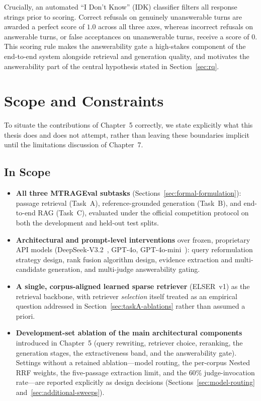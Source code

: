 Crucially, an automated ``I Don't Know'' (IDK) classifier filters all response strings prior to scoring. Correct refusals on genuinely unanswerable turns are awarded a perfect score of $1.0$ across all three axes, whereas incorrect refusals on answerable turns, or false acceptances on unanswerable turns, receive a score of $0$. This scoring rule makes the answerability gate a high-stakes component of the end-to-end system alongside retrieval and generation quality, and motivates the answerability part of the central hypothesis stated in Section~\ref{sec:rq}.

\section{Scope and Constraints}
\label{sec:scope}

To situate the contributions of Chapter~5 correctly, we state explicitly what this thesis does and does not attempt, rather than leaving these boundaries implicit until the limitations discussion of Chapter~7.

\subsection{In Scope}

\begin{itemize}
    \item \textbf{All three MTRAGEval subtasks} (Sections~\ref{sec:formal-formulation}): passage retrieval (Task~A), reference-grounded generation (Task~B), and end-to-end RAG (Task~C), evaluated under the official competition protocol on both the development and held-out test splits.
    \item \textbf{Architectural and prompt-level interventions} over frozen, proprietary API models (DeepSeek-V3.2~\citep{deepseekai2024deepseekv3}, GPT-4o, GPT-4o-mini~\citep{openai2024gpt4o}): query reformulation strategy design, rank fusion algorithm design, evidence extraction and multi-candidate generation, and multi-judge answerability gating.
    \item \textbf{A single, corpus-aligned learned sparse retriever} (ELSER~v1) as the retrieval backbone, with retriever \emph{selection} itself treated as an empirical question addressed in Section~\ref{sec:taskA-ablations} rather than assumed a priori.
    \item \textbf{Development-set ablation of the main architectural components} introduced in Chapter~5 (query rewriting, retriever choice, reranking, the generation stages, the extractiveness band, and the answerability gate). Settings without a retained ablation---model routing, the per-corpus Nested RRF weights, the five-passage extraction limit, and the $60\%$ judge-invocation rate---are reported explicitly as design decisions (Sections~\ref{sec:model-routing} and~\ref{sec:additional-sweeps}).
\end{itemize}

